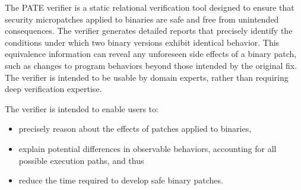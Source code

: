 The PATE verifier is a static relational verification tool designed to ensure that security micropatches applied to binaries are safe and free from unintended consequences.
The verifier generates detailed reports that precisely identify the conditions under which two binary versions exhibit identical behavior.
This equivalence information can reveal any unforeseen side effects of a binary patch, such as changes to program behaviors beyond those intended by the original fix.
The verifier is intended to be usable by domain experts, rather than requiring deep verification expertise.

The verifier is intended to enable users to:
\begin{itemize}
\item precisely reason about the effects of patches applied to binaries,
\item explain potential differences in observable behaviors, accounting for all possible execution paths, and thus
\item reduce the time required to develop safe binary patches.
\end{itemize}

\vspace{0.25in}
